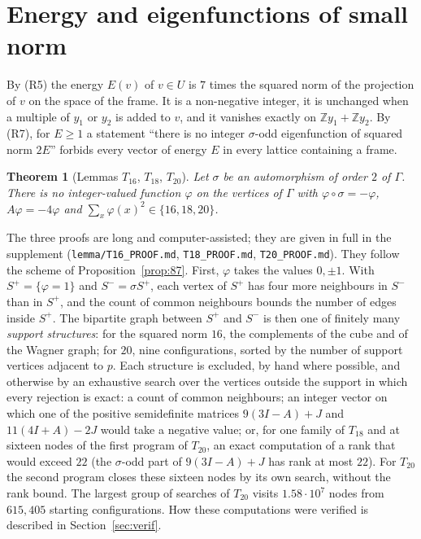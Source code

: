 \documentclass[11pt]{amsart}
\newtheorem{theorem}{Theorem}[section]
\theoremstyle{definition}
\theoremstyle{remark}
\newcommand{\Z}{\mathbb{Z}}
\newcommand{\G}{\Gamma}
\newcommand{\s}{\sigma}
\begin{document}
\section{Energy and eigenfunctions of small norm}\label{sec:energy}

By (R5) the energy $E(v)$ of $v\in U$ is $7$ times the squared norm of the projection of $v$ on the space of the frame. It is
a non-negative integer, it is unchanged when a multiple of $y_1$ or $y_2$ is added to $v$, and it vanishes exactly on
$\Z y_1+\Z y_2$. By (R7), for $E\ge1$ a statement ``there is no integer $\s$-odd eigenfunction of squared norm $2E$''
forbids every vector of energy $E$ in every lattice containing a frame.

\begin{theorem}[Lemmas $T_{16}$, $T_{18}$, $T_{20}$]\label{thm:T}
Let $\s$ be an automorphism of order $2$ of $\G$. There is no integer-valued function $\varphi$ on the vertices of $\G$ with
$\varphi\circ\s=-\varphi$, $A\varphi=-4\varphi$ and $\sum_x\varphi(x)^2\in\{16,18,20\}$.
\end{theorem}

The three proofs are long and computer-assisted; they are given in full in the supplement \cite{repo}
(\texttt{lemma/T16\_PROOF.md}, \texttt{T18\_PROOF.md}, \texttt{T20\_PROOF.md}). They follow the scheme of
Proposition~\ref{prop:87}. First, $\varphi$ takes the values $0,\pm1$. With $S^+=\{\varphi=1\}$ and $S^-=\s S^+$, each vertex
of $S^+$ has four more neighbours in $S^-$ than in $S^+$, and the count of common neighbours bounds the number of edges
inside $S^+$. The bipartite graph between $S^+$ and $S^-$ is then one of finitely many \emph{support structures}: for the
squared norm $16$, the complements of the cube and of the Wagner graph; for $20$, nine configurations, sorted by the number
of support vertices adjacent to $p$. Each structure is excluded, by hand where possible, and otherwise by an exhaustive
search over the vertices outside the support in which every rejection is exact: a count of common neighbours; an integer
vector on which one of the positive semidefinite matrices $9(3I-A)+J$ and $11(4I+A)-2J$ would take a negative value; or, for
one family of $T_{18}$ and at sixteen nodes of the first program of $T_{20}$, an exact computation of a rank that would
exceed $22$ (the $\s$-odd part of $9(3I-A)+J$ has rank at most $22$). For $T_{20}$ the second program closes these sixteen
nodes by its own search, without the rank bound. The largest group of searches of $T_{20}$ visits $1.58\cdot10^7$ nodes
from $615{,}405$ starting configurations. How these
computations were verified is described in Section~\ref{sec:verif}.
\end{document}
